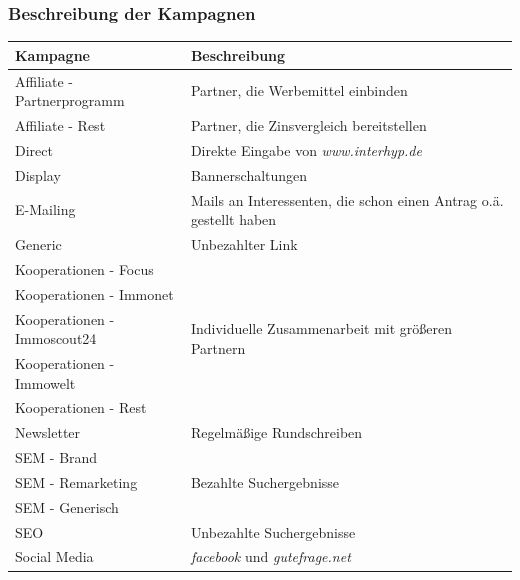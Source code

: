 \begin{frame}\frametitle{Beschreibung der Kampagnen}
	\begin{table}[H]
		\tiny
		\begin{center}
			\begin{tabular}{|l|p{7cm}|}
				\hline \textbf{Kampagne} & \textbf{Beschreibung}\\ \hline
				\hline Affiliate - Partnerprogramm & Partner, die Werbemittel einbinden\\
				\hline Affiliate - Rest & Partner, die Zinsvergleich bereitstellen\\ 
				\hline Direct & Direkte Eingabe von \textit{www.interhyp.de}\\ 
				\hline Display & Bannerschaltungen\\
				\hline E-Mailing & Mails an Interessenten, die schon einen Antrag o.ä. gestellt haben\\
				\hline Generic & Unbezahlter Link\\
				\hline Kooperationen - Focus & \multirow{5}{7cm}{Individuelle Zusammenarbeit mit größeren Partnern}\\
				Kooperationen - Immonet & \\
				Kooperationen - Immoscout24 & \\
				Kooperationen - Immowelt & \\
				Kooperationen - Rest & \\
				\hline Newsletter & Regelmäßige Rundschreiben\\
				\hline SEM - Brand & \multirow{3}{7cm}{Bezahlte Suchergebnisse}\\
				SEM - Remarketing & \\
				SEM - Generisch & \\
				\hline SEO & Unbezahlte Suchergebnisse\\
				\hline Social Media & \textit{facebook} und \textit{gutefrage.net}\\
				\hline
			\end{tabular} 
		\end{center}
	\end{table}
\end{frame}

